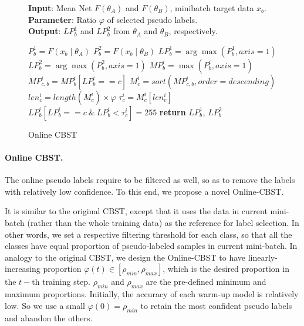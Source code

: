 \documentclass{bmvc2k}
\begin{document}
\begin{wrapfigure}{R}{0.55\textwidth}
 \vspace{-9pt}
    \begin{minipage}{0.55\textwidth}
      \begin{algorithm}[H]
        \caption{Online CBST}
        \label{alg:cbst}
        \textbf{Input}: Mean Net $F(\theta_{A})$ and $F(\theta_{B})$, minibatch target data $x_{b}$. \\
        \textbf{Parameter}: Ratio $ \varphi $ of selected pseudo labels.\\
        \textbf{Output}: $LP_{b}^{1}$ and $LP_{b}^{2}$ from $\theta_{A}$ and $\theta_{B}$, respectively.
        \begin{algorithmic}
            \STATE $P_{b}^{1} = F\left ( x_{b} \mid \theta_{A} \right )$
            \STATE $P_{b}^{2} = F\left ( x_{b} \mid \theta_{B} \right )$
            \STATE $LP_{b}^{1} = \arg\max\left ( P_{b}^{1},axis=1\right ) $
            \STATE $LP_{b}^{2} = \arg\max\left ( P_{b}^{2},axis=1\right ) $
\STATE $MP_{b}^{i} = \max\left ( P_{b}^{i},axis=1\right ) $
            \STATE $MP_{c, b}^{i} = MP_{b}^{i}\left [ LP_{b}^{i}==c \right ]$
            \STATE $M_{c}^{i} = sort\left ( MP_{c, b}^{i}, order=descending \right ) $
            \STATE $len_{c}^{i} = length(M_{c}^{i})\times \varphi$
            \STATE $\tau_{c}^{i} = M_{c}^{i}\left [ len_{c}^{i} \right ] $
            \STATE $LP_{b}^{i}\left[ LP_{b}^{i}==c \ \& \ LP_{b}^{i} < \tau_{c}^{i}  \right] = 255$
            \ENDFOR
            \ENDFOR
            \STATE \textbf{return} $LP_{b}^{1}$, $LP_{b}^{2}$
        \end{algorithmic}
      \end{algorithm}
    \end{minipage}
\end{wrapfigure}

\paragraph{Online CBST.} The online pseudo labels require to be filtered as well, so as to remove the labels with relatively low confidence. To this end, we propose a novel Online-CBST. 

It is similar to the original CBST, except that it uses the data in current mini-batch (rather than the whole training data) as the reference for label selection. In other words, we set a respective filtering threshold for each class, so that all the classes have equal proportion of pseudo-labeled samples in current mini-batch. In analogy to the original CBST, we design the Online-CBST to have linearly-increasing proportion $\varphi(t) \in \left[\rho_{min}, \rho_{max} \right]$, which is the desired proportion in the $t-$th training step. $\rho_{min}$ and $\rho_{max} $ are the pre-defined minimum and maximum proportions. Initially, the accuracy of each warm-up model is relatively low. So we use a small $\varphi(0)=\rho_{min}$ to retain the most confident pseudo labels and abandon the others.
\end{document}
